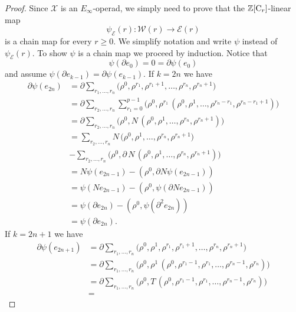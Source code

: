 \begin{proof}
	Since $\mathcal X$ is an $E_\infty$-operad, we simply need to prove that the $\mathbb{Z}[\mathrm{C}_r]$-linear map
	\begin{equation*}
	\psi_{\mathcal E}(r) \colon \mathcal W(r) \to \mathcal E(r)
	\end{equation*}
	is a chain map for every $r \geq 0$.
	We simplify notation and write $\psi$ instead of $\psi_{\mathcal E}(r)$.
	To show $\psi$ is a chain map we proceed by induction.
	Notice that
	\begin{equation*}
	\psi(\partial e_0) = 0 = \partial \psi(e_0)
	\end{equation*}
	and assume $\psi(\partial e_{k-1}) = \partial \psi(e_{k-1})$.
	If $k = 2n$ we have
	\begin{align*}
	\partial \psi(e_{2n}) & = 
	\partial \sum_{r_1, \dots, r_n} 
	\big(\rho^0, \rho^{r_1}, \rho^{r_1+1}, \dots, \rho^{r_n}, \rho^{r_n+1} \big) \\ & =
	\partial \sum_{r_2, \dots, r_n} \sum_{r_1 = 0}^{p-1}
	\big(\rho^0, \rho^{r_1} \, (\rho^0, \rho^{1}, \dots, \rho^{r_n-r_1}, \rho^{r_n - r_1 +1}) \big) \\ & =
	\partial \sum_{r_2, \dots, r_n}
	\big(\rho^0, N\, (\rho^{0}, \rho^{1}, \dots, \rho^{r_n}, \rho^{r_n + 1}) \big) \\ & =
	\sum_{r_2, \dots, r_n}
	N\, \big( \rho^{0}, \rho^{1}, \dots, \rho^{r_n}, \rho^{r_n + 1} \big) \\ & -
	\sum_{r_2, \dots, r_n}
	\big(\rho^0, \partial \, N \, (\rho^{0}, \rho^{1}, \dots, \rho^{r_n}, \rho^{r_n+1}) \big) \\ & =
	N \psi(e_{2n-1}) - (\rho^0, \partial N \psi (e_{2n-1})) \\ & =
	\psi(N e_{2n-1}) - (\rho^0, \psi (\partial N e_{2n-1})) \\ & =
	\psi(\partial e_{2n}) - (\rho^0, \psi (\partial^2 e_{2n})) \\ & =
	\psi(\partial e_{2n}).
	\end{align*}
	If $k = 2n+1$ we have
	\begin{align*}
	\partial \psi(e_{2n+1}) & = 
	\partial \sum_{r_1, \dots, r_n} 
	\big(\rho^0, \rho^1, \rho^{r_1}, \rho^{r_1+1}, \dots, \rho^{r_n}, \rho^{r_n+1} \big) \\ & =
	\partial \sum_{r_1, \dots, r_n}
	\big(\rho^0, \rho^{1} \, (\rho^0, \rho^{r_1-1}, \rho^{r_1}, \dots, \rho^{r_n - 1}, \rho^{r_n}) \big) \\ & =
	\partial \sum_{r_1, \dots, r_n}
	\big(\rho^0, T\, (\rho^0, \rho^{r_1-1}, \rho^{r_1}, \dots, \rho^{r_n - 1}, \rho^{r_n}) \big) \\ & =

\end{align*}
\end{proof}
